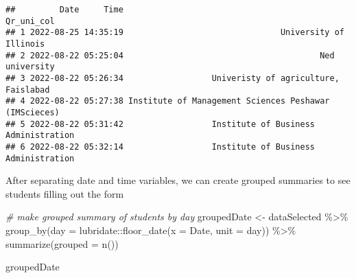 \documentclass[
]{article}
\newenvironment{Shaded}{\begin{snugshade}}{\end{snugshade}}
\newcommand{\AttributeTok}[1]{\textcolor[rgb]{0.77,0.63,0.00}{#1}}
\newcommand{\CommentTok}[1]{\textcolor[rgb]{0.56,0.35,0.01}{\textit{#1}}}
\newcommand{\FunctionTok}[1]{\textcolor[rgb]{0.00,0.00,0.00}{#1}}
\newcommand{\NormalTok}[1]{#1}
\newcommand{\OtherTok}[1]{\textcolor[rgb]{0.56,0.35,0.01}{#1}}
\newcommand{\SpecialCharTok}[1]{\textcolor[rgb]{0.00,0.00,0.00}{#1}}
\newcommand{\StringTok}[1]{\textcolor[rgb]{0.31,0.60,0.02}{#1}}
\begin{document}
\begin{Shaded}
\end{Shaded}

\begin{verbatim}
##         Date     Time                                            Qr_uni_col
## 1 2022-08-25 14:35:19                                University of Illinois
## 2 2022-08-22 05:25:04                                        Ned university
## 3 2022-08-22 05:26:34                  Univeristy of agriculture, Faislabad
## 4 2022-08-22 05:27:38 Institute of Management Sciences Peshawar (IMScieces)
## 5 2022-08-22 05:31:42                  Institute of Business Administration
## 6 2022-08-22 05:32:14                  Institute of Business Administration
\end{verbatim}

After separating date and time variables, we can create grouped
summaries to see students filling out the form

\begin{Shaded}
\begin{Highlighting}[]
\CommentTok{\# make grouped summary of students by day}
\NormalTok{groupedDate }\OtherTok{\textless{}{-}}\NormalTok{ dataSelected }\SpecialCharTok{\%\textgreater{}\%} 
  \FunctionTok{group\_by}\NormalTok{(}\AttributeTok{day =}\NormalTok{ lubridate}\SpecialCharTok{::}\FunctionTok{floor\_date}\NormalTok{(}\AttributeTok{x =}\NormalTok{ Date, }\AttributeTok{unit =} \StringTok{\textquotesingle{}day\textquotesingle{}}\NormalTok{)) }\SpecialCharTok{\%\textgreater{}\%}
  \FunctionTok{summarize}\NormalTok{(}\AttributeTok{grouped =} \FunctionTok{n}\NormalTok{())}

\NormalTok{groupedDate}
\end{Highlighting}
\end{Shaded}
\end{document}
